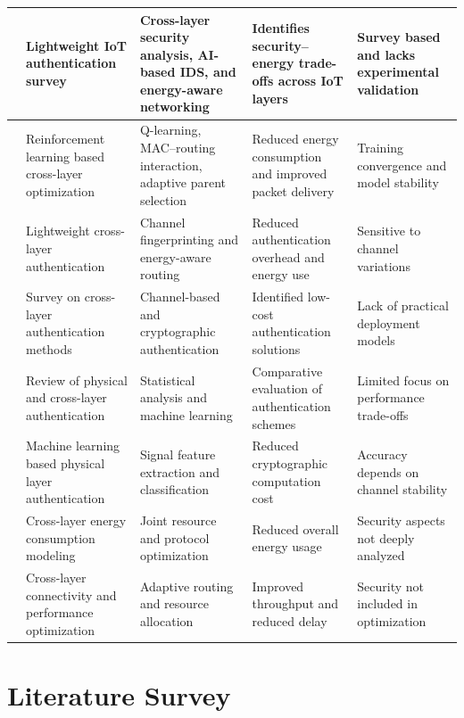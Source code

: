 \documentclass[a4paper,fleqn]{cas-dc}
\numberwithin{equation}{section}
\begin{document}
\begin{table}[htbp]
\begin{tabular}{|c|p{3.2cm}|p{4.0cm}|p{4.0cm}|p{4.0cm}|}
\cite{cetintav2025auth} & Lightweight IoT authentication survey & Cross-layer security analysis, AI-based IDS, and energy-aware networking & Identifies security–energy trade-offs across IoT layers & Survey based and lacks experimental validation \\
\hline

\cite{musaddiq2020rl} & Reinforcement learning based cross-layer optimization & Q-learning, MAC–routing interaction, adaptive parent selection & Reduced energy consumption and improved packet delivery & Training convergence and model stability \\
\hline

\cite{liu2024auth} & Lightweight cross-layer authentication & Channel fingerprinting and energy-aware routing & Reduced authentication overhead and energy use & Sensitive to channel variations \\
\hline

\cite{mohaghegh2024auth} & Survey on cross-layer authentication methods & Channel-based and cryptographic authentication & Identified low-cost authentication solutions & Lack of practical deployment models \\
\hline

\cite{meng2024phyml} & Review of physical and cross-layer authentication & Statistical analysis and machine learning & Comparative evaluation of authentication schemes & Limited focus on performance trade-offs \\
\hline

\cite{mustafa2025phylauth} & Machine learning based physical layer authentication & Signal feature extraction and classification & Reduced cryptographic computation cost & Accuracy depends on channel stability \\
\hline

\cite{mustafa2024energy} & Cross-layer energy consumption modeling & Joint resource and protocol optimization & Reduced overall energy usage & Security aspects not deeply analyzed \\
\hline

\cite{khalil2024connectivity} & Cross-layer connectivity and performance optimization & Adaptive routing and resource allocation & Improved throughput and reduced delay & Security not included in optimization \\
\hline

\end{tabular}
\end{table}


\section{Literature Survey}
\end{document}

